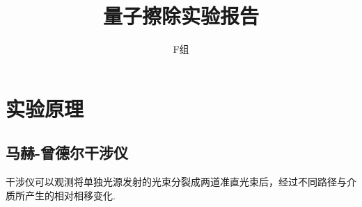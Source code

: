 \documentclass[10pt]{ctexart}
\title{量子擦除实验报告}
\author{F组}
\begin{document}
\maketitle
\section{实验原理}
\subsection{马赫-曾德尔干涉仪}
干涉仪可以观测将单独光源发射的光束分裂成两道准直光束后，经过不同路径与介质所产生的相对相移变化.
\end{document}
